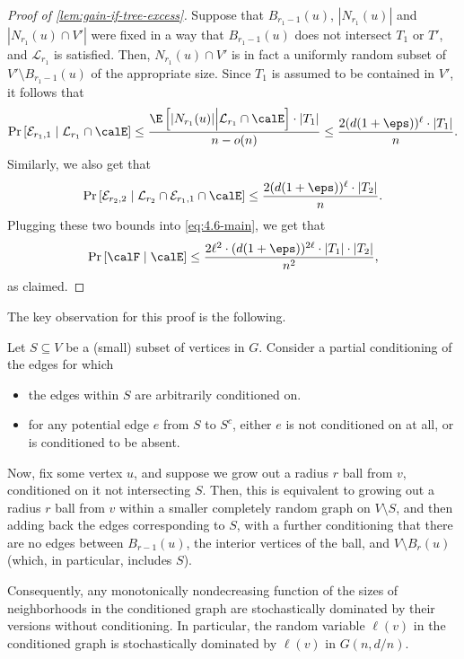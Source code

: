 \documentclass[11pt,letterpaper]{article}
\begin{document}
\begin{proof}[Proof of \cref{lem:gain-if-tree-excess}]
    Suppose that $B_{r_1-1}(u)$, $|N_{r_1}(u)|$ and $|N_{r_1}(u) \cap V'|$ were fixed in a way that $B_{r_1-1}(u)$ does not intersect $T_1$ or $T'$, and $\mathcal{L}_{r_1}$ is satisfied. Then, $N_{r_1}(u) \cap V'$ is in fact a uniformly random subset of $V' \setminus B_{r_1-1}(u)$ of the appropriate size. Since $T_1$ is assumed to be contained in $V'$, it follows that
    \[ \Pr\left[ \mathcal{E}_{r_1,1} \mid \mathcal{L}_{r_1} \cap \calE  \right] \le \frac{\E\left[|N_{r_1}(u)| \Big\vert \mathcal{L}_{r_1} \cap \calE\right] \cdot |T_1|}{n - o(n)} \le \frac{2(d(1+\eps))^{\ell} \cdot |T_1|}{n} . \]
    Similarly, we also get that
    \[ \Pr\left[ \mathcal{E}_{r_2,2} \mid \mathcal{L}_{r_2} \cap \mathcal{E}_{r_1,1} \cap \calE \right] \le \frac{2(d(1+\eps))^{\ell} \cdot |T_2|}{n} . \]
    Plugging these two bounds into \eqref{eq:4.6-main}, we get that
    \[ \Pr\left[ \calF \mid \calE \right] \le \frac{2\ell^2 \cdot (d(1+\eps))^{2\ell} \cdot |T_1| \cdot |T_2|}{n^2}, \]
    as claimed.
\end{proof}

\lineindependent*

The key observation for this proof is the following.

\begin{observation}
    \label{obs:tail-bounds-better-after-conditioning}
    Let $S \subseteq V$ be a (small) subset of vertices in $G$. Consider a partial conditioning of the edges for which
    \begin{itemize}
        \item the edges within $S$ are arbitrarily conditioned on.
        \item for any potential edge $e$ from $S$ to $S^c$, either $e$ is not conditioned on at all, or is conditioned to be absent.
    \end{itemize}
    Now, fix some vertex $u$, and suppose we grow out a radius $r$ ball from $v$, conditioned on it not intersecting $S$. Then, this is equivalent to growing out a radius $r$ ball from $v$ within a smaller completely random graph on $V \setminus S$, and then adding back the edges corresponding to $S$, with a further conditioning that there are no edges between $B_{r-1}(u)$, the interior vertices of the ball, and $V \setminus B_{r}(u)$ (which, in particular, includes $S$).
    
    Consequently, any monotonically nondecreasing function of the sizes of neighborhoods in the conditioned graph are stochastically dominated by their versions without conditioning. In particular, the random variable $\ell(v)$ in the conditioned graph is stochastically dominated by $\ell(v)$ in $G(n,d/n)$.
\end{observation}
\end{document}
